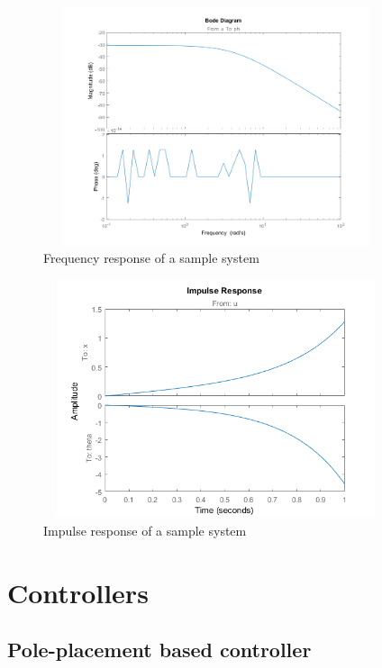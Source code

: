 \documentclass [12pt,letterpaper]{exam}
\begin{document}
\begin{figure}[H]
  \centering
    \includegraphics[width=10.15cm, height=7cm]{sample_freq_response} 
  \caption{Frequency response of a sample system}
  \label{fig:sample_freq_response}
\end{figure}

\begin{figure}[H]
  \centering
    \includegraphics[width=10.15cm, height=7cm]{sample_impulse} 
  \caption{Impulse response of a sample system}
  \label{fig:sample_impulse}
\end{figure}



\newpage
\section{Controllers}
\subsection{Pole-placement based controller}
\end{document}
